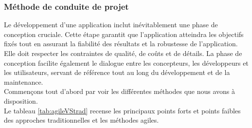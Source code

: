 \documentclass[12pt]{report}
\begin{document}
				\subsubsection{Méthode de conduite de projet}

				\hspace{15pt} Le développement d'une application inclut inévitablement une phase de conception cruciale. Cette étape garantit que l'application atteindra les objectifs fixés tout en assurant la fiabilité des résultats et la robustesse de l'application. Elle doit respecter les contraintes de qualité, de coûts et de détails. La phase de conception facilite également le dialogue entre les concepteurs, les développeurs et les utilisateurs, servant de référence tout au long du développement et de la maintenance.\\
	
				Commençons tout d'abord par voir les différentes méthodes que nous avons à disposition.\\

				Le tableau \ref{tab:agileVStrad} recense les principaux points forts et points faibles des approches traditionnelles et les méthodes agiles.
\end{document}

